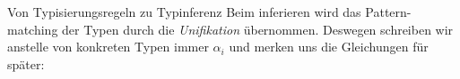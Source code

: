 \documentclass{beamer}
\begin{document}
\begin{frame}{Von Typisierungsregeln zu Typinferenz}
  Beim inferieren wird das Pattern-matching der Typen durch die \emph{Unifikation} übernommen.
  Deswegen schreiben wir anstelle von konkreten Typen immer $\alpha_i$ und merken uns die Gleichungen für später:



\end{frame}
\end{document}
